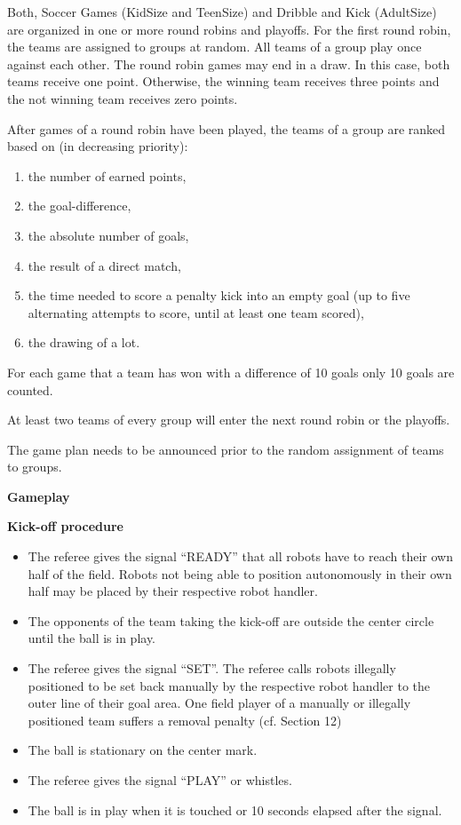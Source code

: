 \bigskip

Both, Soccer Games (KidSize and TeenSize) and Dribble and Kick (AdultSize) are organized in one or more round robins and playoffs. For the first round robin, the teams are assigned to groups at random. All teams of a group play once against each other. The round robin games may end in a draw. In this case, both teams receive one point. Otherwise, the winning team receives three points and the not winning team receives zero points.

\bigskip

After games of a round robin have been played, the teams of a group are ranked based on (in decreasing priority): 

\begin{enumerate}
\item the number of earned points,
\item the goal-difference,
\item the absolute number of goals,
\item the result of a direct match,
\item the time needed to score a penalty kick into an empty goal (up to five alternating attempts to score, until at least one team scored),
\item the drawing of a lot.
\end{enumerate}

\bigskip

For each game that a team has won with a difference of 10 goals only 10 goals are counted.

\bigskip

At least two teams of every group will enter the next round robin or the playoffs.

\bigskip

The game plan needs to be announced prior to the random assignment of teams to groups.

\bigskip

{\bfseries Gameplay}

\headlinebox
 
{\bfseries Kick-off procedure}

\begin{itemize}
\item The referee gives the signal ``READY'' that all robots have to reach their own half of the field. Robots not being able to position autonomously in their own half may be placed by their respective robot handler.
\item The opponents of the team taking the kick-off are outside the center circle until the ball is in play.
\item The referee gives the signal ``SET''. The referee calls robots illegally positioned to be set back manually
by the respective robot handler to the outer line of their goal area. One field player of a manually or illegally positioned team suffers a removal penalty (cf. Section 12)
\item The ball is stationary on the center mark. 
\item The referee gives the signal ``PLAY'' or whistles.
\item The ball is in play when it is touched or 10 seconds elapsed after the signal.
\end{itemize}

